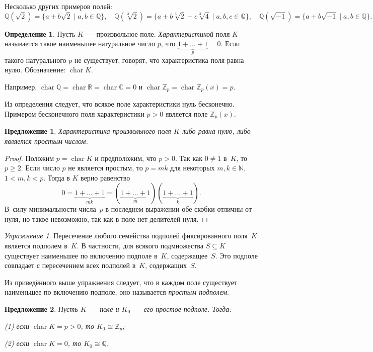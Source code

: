\documentclass[a4paper,10pt]{amsart}
\newcommand{\xar}{\mathop{\mathrm{char}}}
\def\CC{{\mathbb C}}%
\def\ZZ{{\mathbb Z}}%
\def\RR{{\mathbb R}}%
\def\NN{{\mathbb N}}%
\def\QQ{{\mathbb Q}}%
\newtheorem{proposition}{Предложение}
\theoremstyle{definition}
\newtheorem{definition}{Определение}
\theoremstyle{remark}
\newtheorem{exercise}{Упражнение}
\begin{document}
Несколько других примеров полей:
$$
\QQ(\sqrt{2}) = \{a + b \sqrt{2} \mid a, b \in \QQ\}, \quad
\QQ(\sqrt[3]{2}) = \{a + b \sqrt[3]{2} + c\sqrt[3]{4} \mid a, b,
c\in\QQ\}, \quad \QQ(\sqrt{-1}) = \{a + b\sqrt{-1} \mid a, b \in \QQ
\}.
$$

\begin{definition}
	Пусть $K$~--- произвольное поле. {\it Характеристикой} поля $K$
	называется такое наименьшее натуральное число $p$, что
	$\underbrace{1+\ldots+1}_p = 0$. Если такого натурального $p$ не
	существует, говорят, что характеристика поля равна нулю.
	Обозначение: $\xar K$.
\end{definition}

Например, $\xar \QQ = \xar \RR = \xar \CC = 0$ и $\xar \ZZ_p = \xar
\ZZ_p(x) = p$.

Из определения следует, что всякое поле характеристики нуль
бесконечно. Примером бесконечного поля характеристики $p > 0$
является поле $\ZZ_p(x)$.

\begin{proposition}
	Характеристика произвольного поля $K$ либо равна нулю, либо является
	простым числом.
\end{proposition}

\begin{proof}
	Положим $p = \xar K$ и предположим, что $p > 0$. Так как $0 \ne 1$
	в~$K$, то $p \geqslant 2$. Если число $p$ не является простым, то $p
	= mk$ для некоторых $m,k \in \NN$, $1 < m,k < p$. Тогда в $K$ верно
	равенство
	$$
	0 = \underbrace{1 + \ldots + 1}_{mk} = (\underbrace{1 + \ldots +
		1}_m)(\underbrace{1 + \ldots + 1}_k).
	$$
	В~силу минимальности числа~$p$ в последнем выражении обе скобки
	отличны от нуля, но такое невозможно, так как в поле нет делителей
	нуля.
\end{proof}

\begin{exercise}
	Пересечение любого семейства подполей фиксированного поля~$K$
	является подполем в~$K$. В частности, для всякого подмножества $S
	\subseteq K$ существует наименьшее по включению подполе в~$K$,
	содержащее~$S$. Это подполе совпадает с пересечением всех подполей
	в~$K$, содержащих~$S$.
\end{exercise}

Из приведённого выше упражнения следует, что в каждом поле
существует наименьшее по включению подполе, оно называется {\it
	простым подполем}.

\begin{proposition}
	Пусть $K$~--- поле и $K_0$~--- его простое подполе. Тогда:
	
	\textup{(1)} если $\xar K = p > 0$, то $K_0 \cong \ZZ_p$;
	
	\textup{(2)} если $\xar K = 0$, то $K_0 \cong \QQ$.
\end{proposition}
\end{document}
